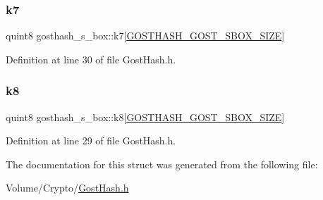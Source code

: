 \mbox{\label{structgosthash__s__box_ab4af14cab85aee9c073f82237dfcd451}} 
\subsubsection{\texorpdfstring{k7}{k7}}
{\footnotesize\ttfamily quint8 gosthash\+\_\+s\+\_\+box\+::k7\mbox{[}\hyperlink{_gost_hash_8h_af1180f1c3243bbce8ea02985c5f44bfe}{G\+O\+S\+T\+H\+A\+S\+H\+\_\+\+G\+O\+S\+T\+\_\+\+S\+B\+O\+X\+\_\+\+S\+I\+ZE}\mbox{]}}



Definition at line 30 of file Gost\+Hash.\+h.

\mbox{\label{structgosthash__s__box_a3336ba3e62d3def6425be698a18e8f3b}} 
\subsubsection{\texorpdfstring{k8}{k8}}
{\footnotesize\ttfamily quint8 gosthash\+\_\+s\+\_\+box\+::k8\mbox{[}\hyperlink{_gost_hash_8h_af1180f1c3243bbce8ea02985c5f44bfe}{G\+O\+S\+T\+H\+A\+S\+H\+\_\+\+G\+O\+S\+T\+\_\+\+S\+B\+O\+X\+\_\+\+S\+I\+ZE}\mbox{]}}



Definition at line 29 of file Gost\+Hash.\+h.



The documentation for this struct was generated from the following file\+:\begin{DoxyCompactItemize}
\item 
Volume/\+Crypto/\hyperlink{_gost_hash_8h}{Gost\+Hash.\+h}\end{DoxyCompactItemize}
